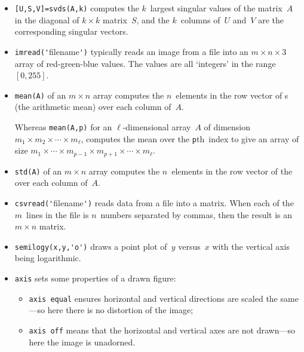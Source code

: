 \begin{itemize}
\begin{itemize}
\item {}\verb|[U,S,V]=svds(A,k)| computes the \(k\)~largest singular values of the matrix~\(A\) in the diagonal of \(k\times k\) matrix~\(S\), and the  \(k\)~columns of~\(U\) and~\(V\) are the corresponding singular vectors.

\item  {}\verb|imread('|filename\verb|')| typically reads an image from a file into an \(m\times n\times 3\) array of red-green-blue values. 
The values are all `integers' in the range~\([0,255]\).

\item {}\verb|mean(A)| of an \(m\times n\) array computes the \(n\)~elements in the row vector of s (the arithmetic mean) over each column of~\(A\).

Whereas \verb|mean(A,p)| for an \(\ell\)-dimensional array~\(A\) of dimension \(m_1\times m_2\times\cdots\times m_\ell\),  computes the mean over the \verb|p|th~index to give an array of size \(m_1\times\cdots\times m_{p-1}\times m_{p+1}\times\cdots\times m_\ell\).

\item {}\verb|std(A)| of an \(m\times n\) array computes the \(n\)~elements in the row vector of the  over each column of~\(A\).

\item  {}\verb|csvread('|filename\verb|')| reads data from a file into a matrix.
When each of the \(m\)~lines in the file is \(n\)~numbers separated by commas, then the result is an \(m\times n\) matrix. 

\item {}\verb|semilogy(x,y,'o')| draws a point plot of~\(y\) versus~\(x\) with the vertical axis being logarithmic.

\item {}\verb|axis| sets some properties of a drawn figure:
\begin{itemize}
\item \verb|axis equal| ensures horizontal and vertical directions are scaled the same---so here there is no distortion of the image;
\item \verb|axis off| means that the horizontal and vertical axes are not drawn---so here the image is unadorned.
\end{itemize}
\end{itemize}


\end{itemize}

